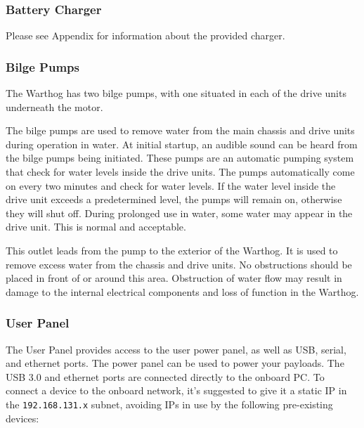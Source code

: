 \documentclass[]{clearpath-latex/clearpath-manual}
\begin{document}
\pagebreak[4]
\subsubsection{Battery Charger}
Please see Appendix for information about the provided charger.

\subsubsection{Bilge Pumps}\label{bilgepumps}
The Warthog has two bilge pumps, with one situated in each of the drive units underneath the motor.

The bilge pumps are used to remove water from the main chassis and drive units during operation in water. At initial startup, an audible sound can be heard from the bilge pumps being initiated. These pumps are an automatic pumping system that check for water levels inside the drive units. The pumps automatically come on every two minutes and check for water levels. If the water level inside the drive unit exceeds a predetermined level, the pumps will remain on, otherwise they will shut off. During prolonged use in water, some water may appear in the drive unit. This is normal and acceptable.


This outlet leads from the pump to the exterior of the Warthog. It is used to remove excess water from the chassis and drive units. No obstructions should be placed in front of or around this area. Obstruction of water flow may result in damage to the internal electrical components and loss of function in the Warthog.

\subsubsection{User Panel}\label{userarea}

The User Panel provides access to the user power panel, as well as USB, serial, and ethernet ports.  The power panel can be used to power your payloads. The USB 3.0 and ethernet  ports are connected directly to the onboard PC. To connect a device to the onboard network, it's suggested to give it a static IP in the \lstinline{192.168.131.x} subnet, avoiding IPs in use by the following pre-existing devices:
\end{document}
